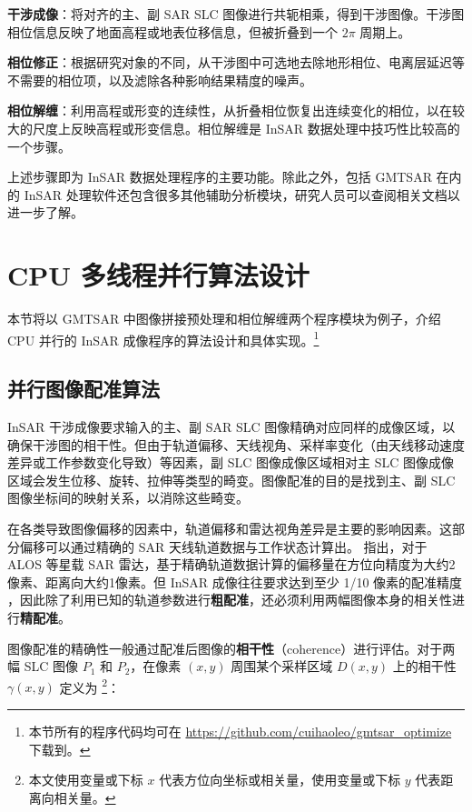 \textbf{干涉成像}：将对齐的主、副 SAR SLC 图像进行共轭相乘，得到干涉图像。干涉图相位信息反映了地面高程或地表位移信息，但被折叠到一个 $2\pi$ 周期上。

\textbf{相位修正}：根据研究对象的不同，从干涉图中可选地去除地形相位、电离层延迟等不需要的相位项，以及滤除各种影响结果精度的噪声。

\textbf{相位解缠}：利用高程或形变的连续性，从折叠相位恢复出连续变化的相位，以在较大的尺度上反映高程或形变信息。相位解缠是 InSAR 数据处理中技巧性比较高的一个步骤。

上述步骤即为 InSAR 数据处理程序的主要功能。除此之外，包括 GMTSAR 在内的 InSAR 处理软件还包含很多其他辅助分析模块，研究人员可以查阅相关文档以进一步了解。


\section{CPU 多线程并行算法设计}

本节将以 GMTSAR 中图像拼接预处理和相位解缠两个程序模块为例子，介绍 CPU 并行的 InSAR 成像程序的算法设计和具体实现。\footnote{本节所有的程序代码均可在 \url{https://github.com/cuihaoleo/gmtsar_optimize} 下载到。}

\subsection{并行图像配准算法}

InSAR 干涉成像要求输入的主、副 SAR SLC 图像精确对应同样的成像区域，以确保干涉图的相干性。但由于轨道偏移、天线视角、采样率变化（由天线移动速度差异或工作参数变化导致）等因素，副 SLC 图像成像区域相对主 SLC 图像成像区域会发生位移、旋转、拉伸等类型的畸变。图像配准的目的是找到主、副 SLC 图像坐标间的映射关系，以消除这些畸变。

在各类导致图像偏移的因素中，轨道偏移和雷达视角差异是主要的影响因素。这部分偏移可以通过精确的 SAR 天线轨道数据与工作状态计算出。\citet{sandwell2011gmtsar} 指出，对于 ALOS 等星载 SAR 雷达，基于精确轨道数据计算的偏移量在方位向精度为大约2像素、距离向大约1像素。但 InSAR 成像往往要求达到至少 1/10 像素的配准精度 \cite{li2008image}，因此除了利用已知的轨道参数进行\textbf{粗配准}，还必须利用两幅图像本身的相关性进行\textbf{精配准}。

图像配准的精确性一般通过配准后图像的\textbf{相干性}（coherence）进行评估。对于两幅 SLC 图像 $P_1$ 和 $P_2$，在像素 $(x, y)$ 周围某个采样区域 $D(x, y)$ 上的相干性 $\gamma(x, y)$ 定义为 \footnote{本文使用变量或下标 $x$ 代表方位向坐标或相关量，使用变量或下标 $y$ 代表距离向相关量。}：

